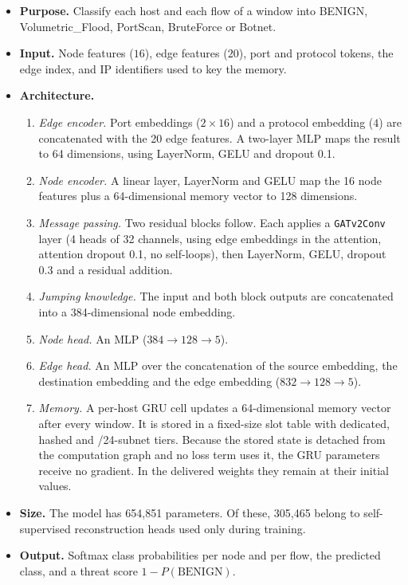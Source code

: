 \documentclass[12pt,a4paper]{report}
\begin{document}
\begin{itemize}
    \item \textbf{Purpose.} Classify each host and each flow of a window into BENIGN, Volumetric\_Flood, PortScan, BruteForce or Botnet.
    \item \textbf{Input.} Node features ($16$), edge features ($20$), port and protocol tokens, the edge index, and IP identifiers used to key the memory.
    \item \textbf{Architecture.}
    \begin{enumerate}
        \item \emph{Edge encoder.} Port embeddings ($2\times16$) and a protocol embedding ($4$) are concatenated with the 20 edge features. A two-layer MLP maps the result to 64 dimensions, using LayerNorm, GELU and dropout 0.1.
        \item \emph{Node encoder.} A linear layer, LayerNorm and GELU map the 16 node features plus a 64-dimensional memory vector to 128 dimensions.
        \item \emph{Message passing.} Two residual blocks follow. Each applies a \texttt{GATv2Conv} layer (4 heads of 32 channels, using edge embeddings in the attention, attention dropout 0.1, no self-loops), then LayerNorm, GELU, dropout 0.3 and a residual addition.
        \item \emph{Jumping knowledge.} The input and both block outputs are concatenated into a 384-dimensional node embedding.
        \item \emph{Node head.} An MLP ($384\rightarrow128\rightarrow5$).
        \item \emph{Edge head.} An MLP over the concatenation of the source embedding, the destination embedding and the edge embedding ($832\rightarrow128\rightarrow5$).
        \item \emph{Memory.} A per-host GRU cell updates a 64-dimensional memory vector after every window. It is stored in a fixed-size slot table with dedicated, hashed and /24-subnet tiers. Because the stored state is detached from the computation graph and no loss term uses it, the GRU parameters receive no gradient. In the delivered weights they remain at their initial values.
    \end{enumerate}
    \item \textbf{Size.} The model has 654{,}851 parameters. Of these, 305{,}465 belong to self-supervised reconstruction heads used only during training.
    \item \textbf{Output.} Softmax class probabilities per node and per flow, the predicted class, and a threat score $1-P(\mathrm{BENIGN})$.
\end{itemize}
\end{document}
